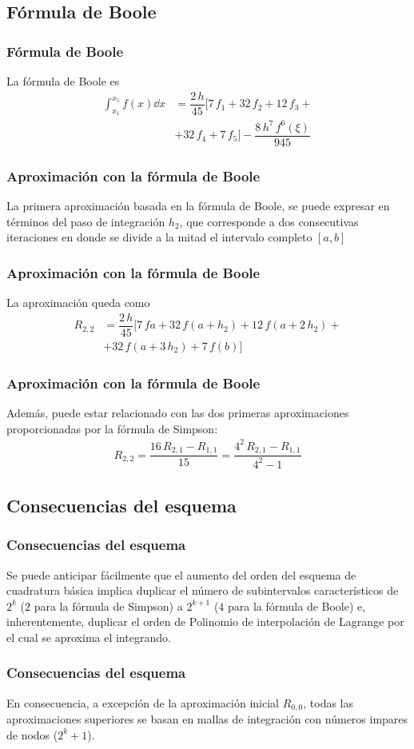 \subsection*{Fórmula de Boole}
\begin{frame}
\frametitle{Fórmula de Boole}
La fórmula de Boole es
\begin{align*}
\int_{x_{1}}^{x_{5}} f(x) \dd{x} &= \dfrac{2 \, h}{45} \bigg[ 7 \, f_{1} + 32 \, f_{2} + 12 \, f_{3} + \\[0.5em]
&+ 32 \, f_{4} + 7 \, f_{5} \bigg] - \dfrac{8 \, h^{7} \, f^{6} (\xi)}{945}
\end{align*}
\end{frame}
\begin{frame}
\frametitle{Aproximación con la fórmula de Boole}
La primera aproximación basada en la fórmula de Boole, se puede expresar en términos del paso de integración $h_{2}$, que corresponde a dos consecutivas iteraciones en donde se divide a la mitad el intervalo completo $[a, b]$
\end{frame}
\begin{frame}
\frametitle{Aproximación con la fórmula de Boole}
La aproximación queda como
\begin{align*}
R_{2, 2} &= \dfrac{2 \, h}{45} \bigg[ 7 \, f{a} + 32 \, f(a + h_{2}) + 12 \, f(a + 2 \, h_{2}) + \\[0.5em]
&+ 32 \, f(a + 3 \, h_{2}) + 7 \, f(b) \bigg] 
\end{align*}
\end{frame}
\begin{frame}
\frametitle{Aproximación con la fórmula de Boole}
Además, puede estar relacionado con las dos primeras aproximaciones proporcionadas por la fórmula de Simpson:
\begin{align*}
R_{2, 2} = \dfrac{16 \, R_{2, 1} - R_{1, 1}}{15} = \dfrac{4^{2} \, R_{2, 1}- R_{1, 1}}{4^{2} - 1}
\end{align*}
\end{frame}
\subsection*{Consecuencias del esquema}
\begin{frame}
\frametitle{Consecuencias del esquema}
Se puede anticipar fácilmente que el aumento del orden del esquema de cuadratura básica implica duplicar el número de subintervalos característicos de $2^{k}$ ($2$ para la fórmula de Simpson) a $2^{k + 1}$ ($4$ para la fórmula de Boole) e, inherentemente, duplicar el orden de Polinomio de interpolación de Lagrange por el cual se aproxima el integrando.
\end{frame}
\begin{frame}
\frametitle{Consecuencias del esquema}
En consecuencia, a excepción de la aproximación inicial $R_{0, 0}$, todas las aproximaciones superiores se basan en mallas de integración con números impares de nodos ($2^{k} + 1$).
\end{frame}
